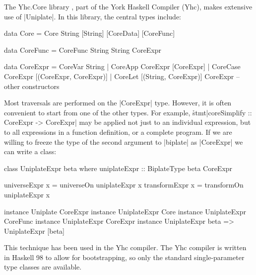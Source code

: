 \begin{example}
The Yhc.Core library \citep{me:yhc_core}, part of the York Haskell Compiler (Yhc), makes extensive use of |Uniplate|. In this library, the central types include:

\begin{comment}
\begin{code}
data CoreData = CoreData
\end{code}
\end{comment}

\begin{code}
data Core      =  Core String [String] [CoreData] [CoreFunc]

data CoreFunc  =  CoreFunc String String CoreExpr

data CoreExpr  =  CoreVar   String
               |  CoreApp   CoreExpr  [CoreExpr]
               |  CoreCase  CoreExpr  [(CoreExpr, CoreExpr)]
               |  CoreLet   [(String, CoreExpr)] CoreExpr
                  -- other constructors
\end{code}

Most traversals are performed on the |CoreExpr| type. However, it is often convenient to start from one of the other types. For example, \h{stmt}|coreSimplify :: CoreExpr -> CoreExpr| may be applied not just to an individual expression, but to all expressions in a function definition, or a complete program. If we are willing to freeze the type of the second argument to |biplate| as |CoreExpr| we can write a class:


\begin{code}
class  UniplateExpr beta where
       uniplateExpr :: BiplateType beta CoreExpr

universeExpr   x = universeOn   uniplateExpr x
transformExpr  x = transformOn  uniplateExpr x

instance Uniplate CoreExpr
instance UniplateExpr Core
instance UniplateExpr CoreFunc
instance UniplateExpr CoreExpr
instance UniplateExpr beta => UniplateExpr [beta]
\end{code}\codeexample
\end{example}
\bigskip

This technique has been used in the Yhc compiler. The Yhc compiler is written in Haskell 98 to allow for bootstrapping, so only the standard single-parameter type classes are available.

